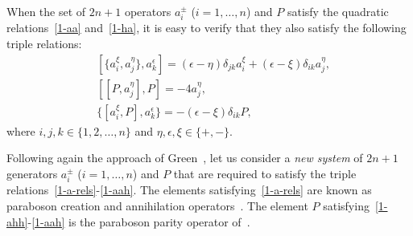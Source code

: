 \documentclass{SciPost}
\begin{document}
When the set of $2n+1$ operators $a_i^\pm$ ($i=1,\ldots,n$) and $P$ satisfy the quadratic relations~\eqref{1-aa} and~\eqref{1-ha}, it is easy to verify that they also satisfy the following triple relations:
\begin{align}
& [\{a_{i}^{\xi}, a_{j}^{\eta}\}, a_{k}^{\epsilon}]=
(\epsilon -\eta) \delta_{jk} a_{i}^{\xi} + (\epsilon -\xi) \delta_{ik}a_{j}^{\eta}, 
\label{1-a-rels} \\
& [[P,a_j^\eta],P]=-4a_j^\eta, \label{1-ahh}\\
& \{[a_i^\xi,P],a^\epsilon_k\}= - (\epsilon-\xi) \delta_{ik} P, \label{1-aah}
\end{align}
where $i,j,k\in \{1,2,\ldots,n\}$ and $\eta, \epsilon, \xi \in\{+,-\}$.

Following again the approach of Green~\cite{Green}, 
let us consider a {\em new system} of $2n+1$ generators $a_i^\pm$ ($i=1,\ldots,n$) and $P$ 
that are required to satisfy the triple relations~\eqref{1-a-rels}-\eqref{1-aah}.
The elements satisfying~\eqref{1-a-rels} are known as paraboson creation and annihilation operators~\cite{Green}.
The element $P$ satisfying~\eqref{1-ahh}-\eqref{1-aah} is the paraboson parity operator of~\cite{SV2026}.
\end{document}
